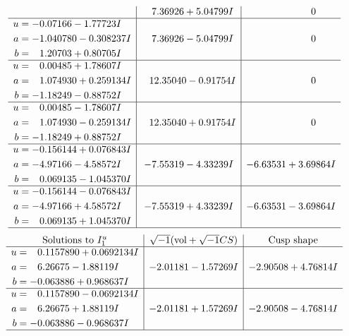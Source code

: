 \documentclass[1p]{elsarticle_modified}
\theoremstyle{definition}
\newcommand{\I}{\sqrt{-1}}
\begin{document}
$$\begin{array}{c|c|c}
 & \phantom{-}7.36926 + 5.04799 I & \phantom{-0.000000 } 0 \\ \hline\begin{aligned}
u &= -0.07166 - 1.77723 I \\
a &= -1.040780 - 0.308237 I \\
b &= \phantom{-}1.20703 + 0.80705 I\end{aligned}
 & \phantom{-}7.36926 - 5.04799 I & \phantom{-0.000000 } 0 \\ \hline\begin{aligned}
u &= \phantom{-}0.00485 + 1.78607 I \\
a &= \phantom{-}1.074930 + 0.259134 I \\
b &= -1.18249 - 0.88752 I\end{aligned}
 & \phantom{-}12.35040 - 0.91754 I & \phantom{-0.000000 } 0 \\ \hline\begin{aligned}
u &= \phantom{-}0.00485 - 1.78607 I \\
a &= \phantom{-}1.074930 - 0.259134 I \\
b &= -1.18249 + 0.88752 I\end{aligned}
 & \phantom{-}12.35040 + 0.91754 I & \phantom{-0.000000 } 0 \\ \hline\begin{aligned}
u &= -0.156144 + 0.076843 I \\
a &= -4.97166 - 4.58572 I \\
b &= \phantom{-}0.069135 - 1.045370 I\end{aligned}
 & -7.55319 - 4.33239 I & -6.63531 + 3.69864 I \\ \hline\begin{aligned}
u &= -0.156144 - 0.076843 I \\
a &= -4.97166 + 4.58572 I \\
b &= \phantom{-}0.069135 + 1.045370 I\end{aligned}
 & -7.55319 + 4.33239 I & -6.63531 - 3.69864 I\\
 \hline 
 \end{array}$$\newpage$$\begin{array}{c|c|c}  
\text{Solutions to }I^u_{1}& \I (\text{vol} + \sqrt{-1}CS) & \text{Cusp shape}\\
 \hline 
\begin{aligned}
u &= \phantom{-}0.1157890 + 0.0692134 I \\
a &= \phantom{-}6.26675 - 1.88119 I \\
b &= -0.063886 + 0.968637 I\end{aligned}
 & -2.01181 - 1.57269 I & -2.90508 + 4.76814 I \\ \hline\begin{aligned}
u &= \phantom{-}0.1157890 - 0.0692134 I \\
a &= \phantom{-}6.26675 + 1.88119 I \\
b &= -0.063886 - 0.968637 I\end{aligned}
 & -2.01181 + 1.57269 I & -2.90508 - 4.76814 I\\
 \hline 
 \end{array}$$\newpage\newpage\renewcommand{\arraystretch}{1}
\end{document}
